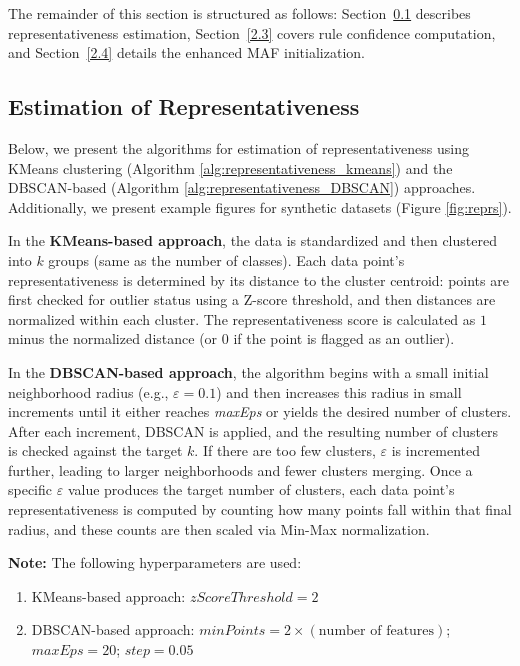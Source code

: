 \documentclass[10pt,a4paper,oneside]{article}
\begin{document}
{\color{red}The remainder of this section is structured as follows: Section~\ref{1.2.1} describes representativeness estimation, Section~\ref{2.3} covers rule confidence computation, and Section~\ref{2.4} details the enhanced MAF initialization.}
\subsection{Estimation of Representativeness}\label{1.2.1}
Below, we present the algorithms for estimation of representativeness using KMeans clustering (Algorithm \ref{alg:representativeness_kmeans}) and the DBSCAN-based (Algorithm \ref{alg:representativeness_DBSCAN}) approaches. Additionally, we present example figures for synthetic datasets (Figure \ref{fig:reprs}).

In the \textbf{KMeans-based approach}, the data is standardized and then clustered into \(k\) groups (same as the number of classes). Each data point’s representativeness is determined by its distance to the cluster centroid: points are first checked for outlier status using a Z-score threshold, and then distances are normalized within each cluster. The representativeness score is calculated as \(1\) minus the normalized distance (or \(0\) if the point is flagged as an outlier).

In the \textbf{DBSCAN-based approach}, the algorithm begins with a small initial neighborhood radius (e.g., \(\varepsilon = 0.1\)) and then increases this radius in small increments until it either reaches \textit{maxEps} or yields the desired number of clusters. After each increment, DBSCAN is applied, and the resulting number of clusters is checked against the target \(k\). If there are too few clusters, \(\varepsilon\) is incremented further, leading to larger neighborhoods and fewer clusters merging. Once a specific \(\varepsilon\) value produces the target number of clusters, each data point’s representativeness is computed by counting how many points fall within that final radius, and these counts are then scaled via Min-Max normalization.

\textbf{Note:} The following hyperparameters are used:
\begin{enumerate}
    \item KMeans-based approach: $zScoreThreshold = 2$
    \item DBSCAN-based approach: $minPoints = 2 \times (\text{number of features})$; $maxEps = 20$; $step = 0.05$ 
\end{enumerate}
\end{document}
